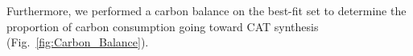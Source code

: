 \documentclass[12pt]{article}
\begin{document}
Furthermore, we performed a carbon balance on the best-fit set to determine the proportion of carbon consumption going toward CAT synthesis (Fig.~\ref{fig:Carbon_Balance}).
\end{document}
